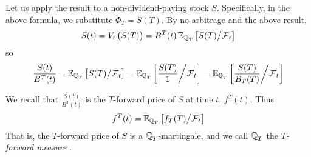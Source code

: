 \documentclass[11pt]{article}
\begin{document}
Let us apply the result to a non-dividend-paying stock $S$. Specifically, in the above formula, we substitute $\widetilde{\Phi}_T = S(T)$. By no-arbitrage and the above result, 
$$ S(t) = V_t\left(S(T)\right) = B^T(t) \operatorname{\mathbb E}_{\operatorname{\mathbb Q}_T} \left[ S(T) \middle/ \operatorname{\mathcal F}_t \right]$$
so
$$ \frac{S(t)}{B^T(t)} = \operatorname{\mathbb E}_{\operatorname{\mathbb Q}_T} \left[ S(T) \middle/ \operatorname{\mathcal F}_t \right] = \operatorname{\mathbb E}_{\operatorname{\mathbb Q}_T} \left[ \frac{S(T)}{1} \middle/ \operatorname{\mathcal F}_t \right] = \operatorname{\mathbb E}_{\operatorname{\mathbb Q}_T} \left[ \frac{S(T)}{B_T(T)} \middle/ \operatorname{\mathcal F}_t \right] $$
\begin{remark}[Geman 1989]
We recall that $\frac {S(t)}{B^T(t)}$ is the $T$-forward price of $S$ at time $t$, $f^T(t)$.
Thus 
$$ f^T(t) = \operatorname{\mathbb E}_{\operatorname{\mathbb Q}_T} \left[ f_T(T) \middle/ \operatorname{\mathcal F}_t \right]$$
That is, the $T$-forward price of $S$ is a $\operatorname{\mathbb Q}_T$-martingale, and we call $\operatorname{\mathbb Q}_T$ the {\em $T$-forward measure} .
\end{remark}
\end{document}
